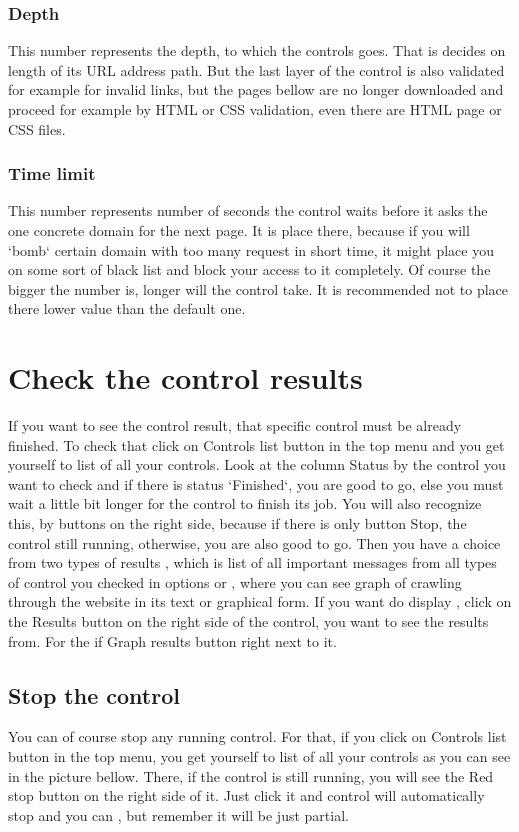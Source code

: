 \documentclass[12pt,a4paper]{article}
\begin{document}
\subsubsection{Depth}
This number represents the depth, to which the controls goes. That is decides on length of its URL address path. But the last layer of the control is also validated for example for invalid links, but the pages bellow are no longer downloaded and proceed for example by HTML or CSS validation, even there are HTML page or CSS files.
\subsubsection{Time limit}
This number represents number of seconds the control waits before it asks the one concrete domain for the next page. It is place there, because if you will `bomb` certain domain with too many request in short time, it might place you on some sort of black list and block your access to it completely. Of course the bigger the number is, longer will the control take. It is recommended not to place there lower value than the default one.
\section{Check the control results} \label{results}
If you want to see the control result, that specific control must be already finished. To check that click on Controls list button in the top menu and you get yourself to list of all your controls. Look at the column Status by the control you want to check and if there is status `Finished`, you are good to go, else you must wait a little bit longer for the control to finish its job. You will also recognize this, by buttons on the right side, because if there is only button Stop, the control still running, otherwise, you are also good to go. Then you have a choice from two types of results , which is list of all important messages from all types of control you checked in options or , where you can see graph of crawling through the website in its text or graphical form. If you want do display , click on the Results button on the right side of the control, you want to see the results from. For the  if Graph results button right next to it.
\subsection{Stop the control}
You can of course stop any running control. For that, if you click on Controls list button in the top menu, you get yourself to list of all your controls as you can see in the picture bellow. There, if the control is still running, you will see the Red stop button on the right side of it. Just click it and control will automatically stop and you can , but remember it will be just partial.
\end{document}
